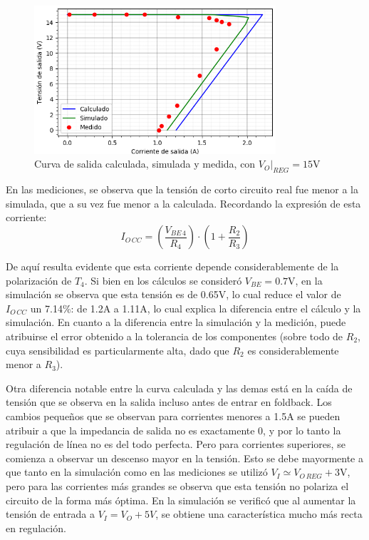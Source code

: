 \documentclass[e2_tp1_main.tex]{subfiles}
\begin{document}
\begin{figure}[!htp]
	\centering
	\includegraphics[width=0.8\textwidth]
	{curvas_salida/e2_tp1_carac_salida_15V.png}
	\caption{Curva de salida calculada, simulada y medida, con $V_O|_{REG}=15$V}
	\label{fig:cs15}
\end{figure}


En las mediciones, se observa que la tensi\'on de corto circuito real fue menor a la simulada, que a su vez fue menor a la calculada. Recordando la expresi\'on de esta corriente:
\[ I_{O\, CC} = 	\left( \frac{V_{BE\, 4}}{R_4} \right) \cdot
				\left( 1 + \frac{R_2}{R_3} \right)\]

De aqu\'i resulta evidente que esta corriente depende considerablemente de la polarizaci\'on de $T_4$. Si bien en los c\'alculos se consider\'o $V_{BE}=0.7$V, en la simulaci\'on se observa que esta tensi\'on es de 0.65V, lo cual reduce el valor de $I_{O\,CC}$ un 7.14\%: de 1.2A a 1.11A, lo cual explica la diferencia entre el c\'alculo y la simulaci\'on. En cuanto a la diferencia entre la simulaci\'on y la medici\'on, puede atribuirse el error obtenido a la tolerancia de los componentes (sobre todo de $R_2$, cuya sensibilidad es particularmente alta, dado que $R_2$ es considerablemente menor a $R_3$).

Otra diferencia notable entre la curva calculada y las demas est\'a en la ca\'ida de tensi\'on que se observa en la salida incluso antes de entrar en foldback. Los cambios peque\~nos que se observan para corrientes menores a 1.5A se pueden atribuir a que la impedancia de salida no es exactamente 0, y por lo tanto la regulaci\'on de l\'inea no es del todo perfecta.  Pero para corrientes superiores, se comienza a observar un descenso mayor en la tensi\'on. Esto se debe mayormente a que tanto en la simulaci\'on como en las mediciones se utiliz\'o $V_I \simeq V_{O\, REG} + 3$V, pero para las corrientes m\'as grandes se observa que esta tensi\'on no polariza el circuito de la forma m\'as \'optima. En la simulaci\'on se verific\'o que al aumentar la tensi\'on de entrada a $V_I = V_O + 5V$, se obtiene una caracter\'istica mucho m\'as recta en regulaci\'on.
 
\end{document}
